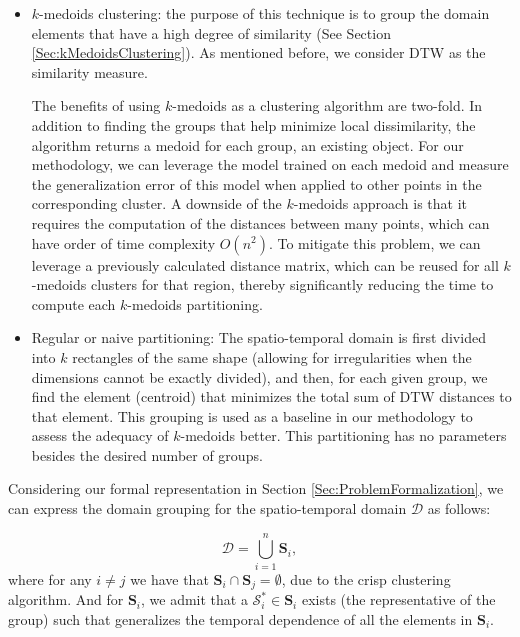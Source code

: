 \begin{itemize}%
	\item $k$-medoids clustering: the purpose of this technique is to group the domain elements that have a high degree of similarity (See Section \ref{Sec:kMedoidsClustering}). As mentioned before, we consider DTW as the similarity measure. 
	
	The benefits of using $k$-medoids as a clustering algorithm are two-fold. In addition to finding the groups that help minimize local dissimilarity, the algorithm returns a medoid for each group, an existing object. For our methodology, we can leverage the model trained on each medoid and measure the generalization error of this model when applied to other points in the corresponding cluster. A downside of the $k$-medoids approach is that it requires the computation of the distances between many points, which can have order of time complexity $O(n^2)$. To mitigate this problem, we can leverage a previously calculated distance matrix, which can be reused for all $k$-medoids clusters for that region, thereby significantly reducing the time to compute each $k$-medoids partitioning.
	
	\item Regular or naive partitioning: The spatio-temporal domain is first divided into $k$ rectangles of the same shape (allowing for irregularities when the dimensions cannot be exactly divided), and then, for each given group, we find the element (centroid) that minimizes the total sum of DTW distances to that element. This grouping is used as a baseline in our methodology to assess the adequacy of $k$-medoids better. This partitioning has no parameters besides the desired number of groups.
\end{itemize}

Considering our formal representation in Section \ref{Sec:ProblemFormalization}, we can express the domain grouping for the spatio-temporal domain $\mathcal{D}$ as follows:

\begin{equation}
\mathcal{D} = \bigcup_{i=1}^{n} \mathbf{S}_{i},
\end{equation}
where for any $i\neq j$ we have that $\mathbf{S}_{i} \cap \mathbf{S}_{j} = \emptyset$, due to the crisp clustering algorithm. And for $\mathbf{S}_{i}$, we admit that a $\mathcal{S}_{i}^{*} \in \mathbf{S}_{i}$ exists (the representative of the group) such that generalizes the temporal dependence of all the elements in $\mathbf{S}_{i}$.

